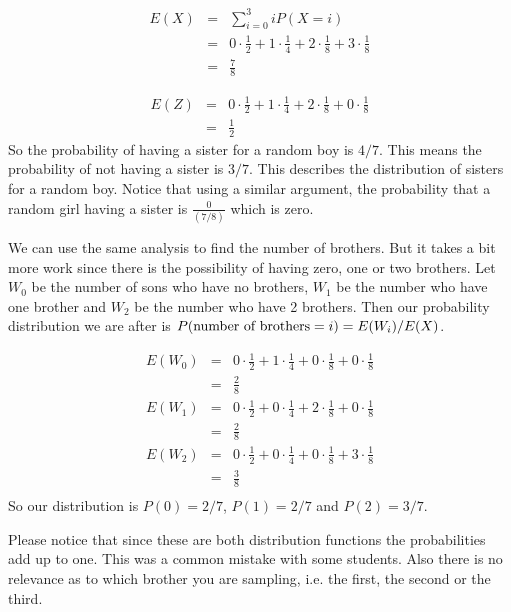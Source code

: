 \documentclass[10pt,a4paper]{article}
\begin{document}
\begin{flushleft}
\begin{eqnarray*}
E(X) &=& \sum_{i=0}^3 i P(X=i)\\
&=& 0 \cdot \frac{1}{2}+ 1 \cdot \frac{1}{4}+ 2 \cdot \frac{1}{8} + 3 \cdot \frac{1}{8} \\
&=& \frac{7}{8}
\end{eqnarray*}

\begin{eqnarray*}
E(Z) &=&  0 \cdot \frac{1}{2}+ 1 \cdot \frac{1}{4}+ 2 \cdot \frac{1}{8} + 0 \cdot \frac{1}{8} \\
&=& \frac{1}{2}
\end{eqnarray*}
So the probability of having a sister for a random boy is $4/7$.  This
means the probability of not having a sister is $3/7$.  This describes
the distribution of sisters for a random boy.  Notice that using a
similar argument, the probability that a random girl having a sister
is $\frac{0}{(7/8)}$ which is zero.

We can use the same analysis to find the number of brothers.  But it
takes a bit more work since there is the possibility of having zero,
one or two brothers.  Let $W_0$ be the number of sons who
have no brothers, $W_1$ be the number who have one brother and $W_2$
be the number who have 2 brothers.  Then our probability distribution
we are after is $P(\hbox{number of brothers} = i) = E(W_i)/E(X)$.  

\begin{eqnarray*}
E(W_0) &=&  0 \cdot \frac{1}{2}+ 1 \cdot \frac{1}{4}+ 0 \cdot \frac{1}{8} + 0 \cdot \frac{1}{8} \\
&=& \frac{2}{8}\\
E(W_1) &=&  0 \cdot \frac{1}{2}+ 0 \cdot \frac{1}{4}+ 2 \cdot \frac{1}{8} + 0 \cdot \frac{1}{8} \\
&=& \frac{2}{8}\\
E(W_2) &=&  0 \cdot \frac{1}{2}+ 0 \cdot \frac{1}{4}+ 0 \cdot \frac{1}{8} + 3 \cdot \frac{1}{8} \\
&=& \frac{3}{8}\\
\end{eqnarray*}
So our distribution is $P(0) = 2/7$, $P(1) = 2/7$ and $P(2) = 3/7$.

Please notice that since these are both distribution functions the
probabilities add up to one. This was a common mistake with some
students. Also there is no relevance as to which brother you are
sampling, i.e. the first, the second or the third.

\end{flushleft}
\end{document}
